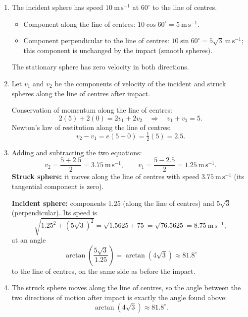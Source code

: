 \documentclass[11pt]{article}
\begin{document}
\begin{corrige}
\begin{enumerate}
\item The incident sphere has speed $10\ \mathrm{m\,s^{-1}}$ at $60^{\circ}$ to the line of centres.
\begin{itemize}
\item Component along the line of centres: $10\cos 60^{\circ}=5\ \mathrm{m\,s^{-1}}$.
\item Component perpendicular to the line of centres: $10\sin 60^{\circ}=5\sqrt3\ \mathrm{m\,s^{-1}}$; this component is unchanged by the impact (smooth spheres).
\end{itemize}
The stationary sphere has zero velocity in both directions.
\item Let $v_{1}$ and $v_{2}$ be the components of velocity of the incident and struck spheres along the line of centres after impact.

Conservation of momentum along the line of centres:
\[ 2(5)+2(0)=2v_{1}+2v_{2}\quad\Longrightarrow\quad v_{1}+v_{2}=5. \]
Newton's law of restitution along the line of centres:
\[ v_{2}-v_{1}=e(5-0)=\tfrac12(5)=2.5. \]
\item Adding and subtracting the two equations:
\[ v_{2}=\frac{5+2.5}{2}=3.75\ \mathrm{m\,s^{-1}},\qquad v_{1}=\frac{5-2.5}{2}=1.25\ \mathrm{m\,s^{-1}}. \]
\textbf{Struck sphere:} it moves along the line of centres with speed $3.75\ \mathrm{m\,s^{-1}}$ (its tangential component is zero).

\textbf{Incident sphere:} components $1.25$ (along the line of centres) and $5\sqrt3$ (perpendicular). Its speed is
\[ \sqrt{1.25^{2}+(5\sqrt3)^{2}}=\sqrt{1.5625+75}=\sqrt{76.5625}=8.75\ \mathrm{m\,s^{-1}}, \]
at an angle
\[ \arctan\!\left(\frac{5\sqrt3}{1.25}\right)=\arctan(4\sqrt3)\approx 81.8^{\circ} \]
to the line of centres, on the same side as before the impact.
\item The struck sphere moves along the line of centres, so the angle between the two directions of motion after impact is exactly the angle found above:
\[ \arctan(4\sqrt3)\approx 81.8^{\circ}. \]
\end{enumerate}
\end{corrige}
\end{document}

